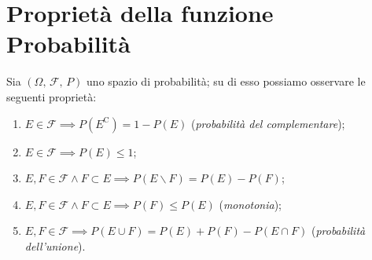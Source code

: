     \section{Proprietà della funzione Probabilità}
    \begin{prty}\label{prty:Proprietà_funzione_probabilità}
            Sia $(\Omega,\,\mathscr{F},\,P)$ uno spazio di probabilità; su di esso possiamo osservare le seguenti proprietà:
            \begin{enumerate}
                \item $E \in \mathscr{F} \implies P(E^{\text{C}}) = 1 - P(E)$ (\textit{probabilità del complementare});
                \item $E \in \mathscr{F} \implies P(E) \leq 1$;
                \item $E,F \in \mathscr{F} \land F \subset E \implies P(E \backslash F) = P(E) - P(F)$;
                \item $E,F \in \mathscr{F} \land F \subset E \implies P(F) \leq P(E)$ (\textit{monotonia});
                \item $E,F \in \mathscr{F} \implies P(E \cup F) = P(E) + P(F) - P(E \cap F)$ (\textit{probabilità dell'unione}).
            \end{enumerate}
        \end{prty}
